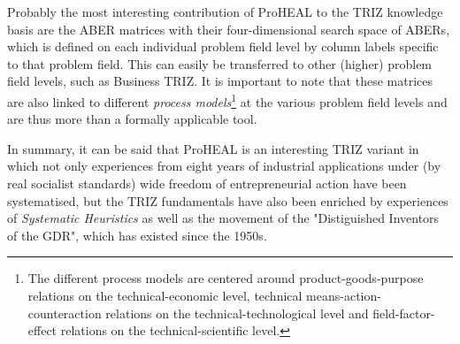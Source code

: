 \documentclass[11pt,a4paper]{article}
\begin{document}
Probably the most interesting contribution of ProHEAL to the TRIZ knowledge
basis are the ABER matrices with their four-dimensional search space of ABERs,
which is defined on each individual problem field level by column labels
specific to that problem field.  This can easily be transferred to other
(higher) problem field levels, such as Business TRIZ. It is important to note
that these matrices are also linked to different \emph{process
  models}\footnote{The different process models are centered around
  product-goods-purpose relations on the technical-economic level, technical
  means-action-counteraction relations on the technical-technological level
  and field-factor-effect relations on the technical-scientific level.} at the
various problem field levels and are thus more than a formally applicable
tool.

In summary, it can be said that ProHEAL is an interesting TRIZ variant in
which not only experiences from eight years of industrial applications under
(by real socialist standards) wide freedom of entrepreneurial action have been
systematised, but the TRIZ fundamentals have also been enriched by experiences
of \emph{Systematic Heuristics} \cite{RM-23} as well as the movement of the
"Distiguished Inventors of the GDR", which has existed since the 1950s.
\end{document}
